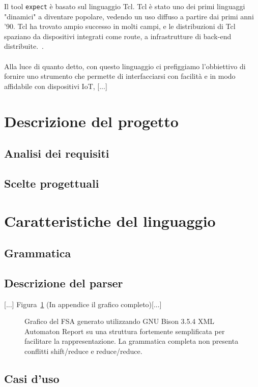 \documentclass[]{article}
\begin{document}
Il tool \texttt{expect} è basato sul linguaggio Tcl. Tcl è stato uno dei primi linguaggi "dinamici" a diventare popolare, vedendo un uso diffuso a partire dai primi anni '90. Tcl ha trovato ampio successo in molti campi, e le distribuzioni di Tcl spaziano da dispositivi integrati come route, a infrastrutture di back-end distribuite.~\cite{nadkarni2017tcl}.\\\\

Alla luce di quanto detto, con questo linguaggio ci prefiggiamo l'obbiettivo di fornire uno strumento che permette di interfacciarsi con facilità e in modo affidabile con dispositivi IoT, [...]

\section{Descrizione del progetto}\label{section:descrizione}
\subsection{Analisi dei requisiti}
\subsection{Scelte progettuali}
\section{Caratteristiche del linguaggio}\label{section:caratteristiche-linguaggio}
\subsection{Grammatica}
\subsection{Descrizione del parser}
{[...]} Figura~\ref{fig:parser_simple} (In appendice il grafico completo)[...]
\begin{figure}
	\centering
	\caption{Grafico del FSA generato utilizzando  GNU Bison 3.5.4 XML Automaton Report su una struttura fortemente semplificata per facilitare la rappresentazione. La grammatica completa non presenta conflitti shift/reduce e reduce/reduce.}
	\label{fig:parser_simple}
\end{figure}

\subsection{Casi d'uso}\label{subsection:casi-d_uso}
\end{document}
